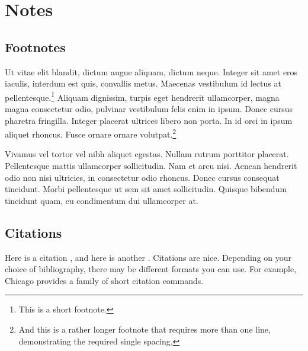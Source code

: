 \chapter{Notes}

\section{Footnotes}

Ut vitae elit blandit, dictum augue aliquam, dictum neque. Integer sit amet eros
iaculis, interdum est quis, convallis metus. Maecenas vestibulum id lectus at
pellentesque.\footnote{This is a short footnote.} Aliquam dignissim, turpis eget
hendrerit ullamcorper, magna magna consectetur odio, pulvinar vestibulum felis
enim in ipsum. Donec cursus pharetra fringilla. Integer placerat ultrices libero
non porta. In id orci in ipsum aliquet rhoncus. Fusce ornare ornare
volutpat.\footnote{And this is a rather longer footnote that requires more than
one line, demonstrating the required single spacing.}

Vivamus vel tortor vel nibh aliquet egestas. Nullam rutrum porttitor placerat.
Pellentesque mattis ullamcorper sollicitudin. Nam et arcu nisi. Aenean hendrerit
odio non nisi ultricies, in consectetur odio rhoncus. Donec cursus consequat
tincidunt. Morbi pellentesque ut sem sit amet sollicitudin. Quisque bibendum
tincidunt quam, eu condimentum dui ullamcorper at.

\section{Citations}

Here is a citation \cite{fake1}, and here is another \cite{fake2}. Citations are
nice. Depending on your choice of bibliography, there may be different formats
you can use. For example, Chicago provides a family of short citation commands.
